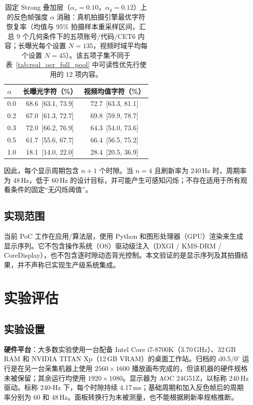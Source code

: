 \begin{table}[!t]
\caption{固定 Strong 叠加层（$\alpha_s=0.10$，$\alpha_g=0.12$）上的反色帧强度 $\alpha$ 消融：真机拍摄引擎最优字符恢复率（均值与 95\% 拍摄样本重采样区间，汇总 9 个几何条件下的五项账号/代码/CET6 内容；长曝光每个设置 $N=135$，视频时域平均每个设置 $N=45$）。该五项子集不同于表~\ref{tab:real_ocr_full_pool} 中可读性优先行使用的 12 项内容。}
\label{tab:inversion_ablation}
\centering
\footnotesize
\begin{tabular}{lcc}
\toprule
$\alpha$ & 长曝光字符（\%） & 视频均值字符（\%） \\
\midrule
0.0 & 68.6~[63.1, 73.9] & 72.7~[63.3, 81.1] \\
0.2 & 67.0~[61.3, 72.7] & 69.8~[59.9, 78.7] \\
0.3 & 72.0~[66.2, 76.9] & 64.3~[54.0, 73.6] \\
0.5 & 61.7~[55.6, 67.7] & 66.4~[56.5, 75.2] \\
1.0 & 18.1~[14.0, 22.0] & 28.4~[20.5, 36.9] \\
\bottomrule
\end{tabular}
\end{table}

因此，每个显示周期包含 $n+1$ 个时隙。当 $n=4$ 且刷新率为 240\,Hz 时，周期率为 48\,Hz，低于 60\,Hz 的设计目标，并可能产生可感知闪烁；不存在适用于所有观看条件的固定“无闪烁阈值”。

\subsection{实现范围}

当前 PoC 工作在应用/算法层，使用 Python 和图形处理器（GPU）渲染来生成显示序列。它不包含操作系统（OS）驱动级注入（DXGI / KMS-DRM / CoreDisplay），也不包含逐时隙动态背光控制。本文验证的是显示序列及其拍摄结果，并不声称已实现生产级系统集成。


\section{实验评估}
\label{sec:evaluation}

\subsection{实验设置}
\label{sec:setup}

\textbf{硬件平台}：大多数实验使用一台配备 Intel Core i7-8700K（3.70\,GHz）、32\,GB RAM 和 NVIDIA TITAN Xp（12\,GB VRAM）的桌面工作站。归档的 d0.5/$0^{\circ}$ 运行是在另一台采集机器上使用 $2560\times1600$ 播放画布完成的，但该机器的硬件规格未被保留；其余运行均使用 $1920\times1080$。显示器为 AOC 24G51Z，以标称 240\,Hz 驱动。标称 240-Hz 下，每个时隙持续 4.17\,ms；基础周期和加入反色帧后的周期率分别为 60 和 48\,Hz。面板转换行为未被测量，也不能根据刷新率规格推断。

